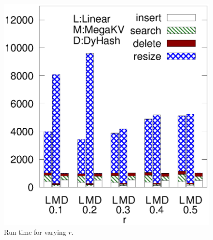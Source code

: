 \begin{figure}[htp]
\begin{minipage}{0.19\linewidth}
		\centerline{\dsali}
	\end{minipage}
	\begin{minipage}{0.19\linewidth}\centering
		\includegraphics[width=\linewidth]{pic/dynamic/random/diff_r.eps}
		\centerline{\dsrandom}
	\end{minipage}
	\caption{Run time for varying $r$.}
	\label{fig:vary-r-time}
\end{figure}
%

